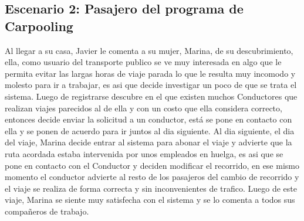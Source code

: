 \documentclass[a4paper,titlepage,10pt]{article}
\begin{document}
\subsection{Escenario 2: Pasajero del programa de Carpooling}
Al llegar a su casa, Javier le comenta a su mujer, Marina, de su descubrimiento, ella, como usuario del transporte publico se ve muy interesada en algo que le permita evitar las largas horas de viaje parada lo que le resulta muy incomodo y molesto para ir a trabajar, es asi que decide investigar un poco de que se trata el sistema.
Luego de registrarse descubre en el que existen muchos Conductores que realizan viajes parecidos al de ella y con un costo que ella considera correcto, entonces decide enviar la solicitud a un conductor, est\'a se pone en contacto con ella y se ponen de acuerdo para ir juntos al dia siguiente.
Al dia siguiente, el dia del viaje, Marina decide entrar al sistema para abonar el viaje y advierte que la ruta acordada estaba intervenida por unos empleados en huelga, es asi que se pone en contacto con el Conductor y deciden modificar el recorrido, en ese mismo momento el conductor advierte al resto de los pasajeros del cambio de recorrido y el viaje se realiza de forma correcta y sin inconvenientes de trafico.
Luego de este viaje, Marina se siente muy satisfecha con el sistema y se lo comenta a todos sus compa\~neros de trabajo.
\end{document}
